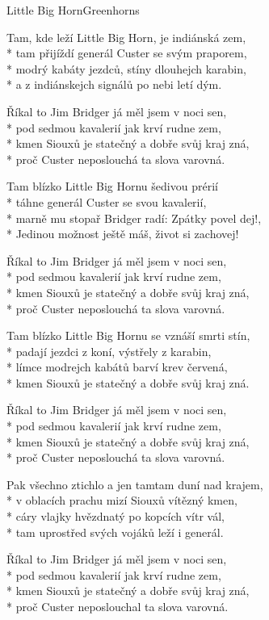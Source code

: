 \documentclass[10.5pt]{book}
\begin{document}
\begin{poem}{Little Big Horn}{Greenhorns}

\settowidth{\versewidth}{Tam, kde leží Little Big Horn, je indiánská zem,}

Tam, kde leží Little Big Horn, je indiánská zem,\\*
tam přijíždí generál Custer se svým praporem,\\*
modrý kabáty jezdců, stíny dlouhejch karabin,\\*
a z indiánskejch signálů po nebi letí dým.

Říkal to Jim Bridger já měl jsem v noci sen,\\*
pod sedmou kavalerií jak krví rudne zem,\\*
kmen Siouxů je statečný a dobře svůj kraj zná,\\*
proč Custer neposlouchá ta slova varovná.

Tam blízko Little Big Hornu šedivou prérií\\*
táhne generál Custer se svou kavalerií,\\*
marně mu stopař Bridger radí: Zpátky povel dej!,\\*
Jedinou možnost ještě máš, život si zachovej!

Říkal to Jim Bridger já měl jsem v noci sen,\\*
pod sedmou kavalerií jak krví rudne zem,\\*
kmen Siouxů je statečný a dobře svůj kraj zná,\\*
proč Custer neposlouchá ta slova varovná.

Tam blízko Little Big Hornu se vznáší smrti stín,\\*
padají jezdci z koní, výstřely z karabin,\\*
límce modrejch kabátů barví krev červená,\\*
kmen Siouxů je statečný a dobře svůj kraj zná.

Říkal to Jim Bridger já měl jsem v noci sen,\\*
pod sedmou kavalerií jak krví rudne zem,\\*
kmen Siouxů je statečný a dobře svůj kraj zná,\\*
proč Custer neposlouchá ta slova varovná.

Pak všechno ztichlo a jen tamtam duní nad krajem,\\*
v oblacích prachu mizí Siouxů vítězný kmen,\\*
cáry vlajky hvězdnatý po kopcích vítr vál,\\*
tam uprostřed svých vojáků leží i generál.

Říkal to Jim Bridger já měl jsem v noci sen,\\*
pod sedmou kavalerií jak krví rudne zem,\\*
kmen Siouxů je statečný a dobře svůj kraj zná,\\*
proč Custer neposlouchal ta slova varovná.

\end{poem}
\end{document}
